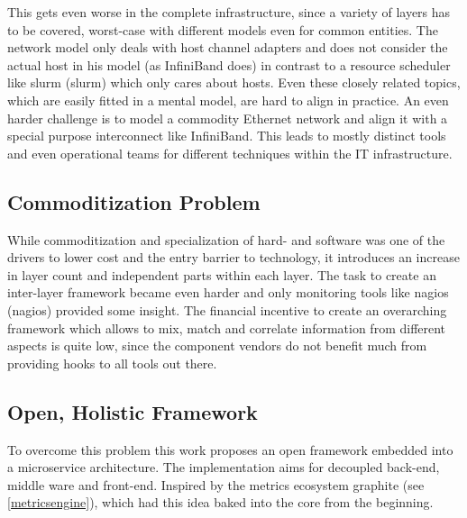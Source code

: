 This gets even worse in the complete infrastructure, since a variety of layers has to be covered, worst-case with different models even for common entities.
The network model only deals with host channel adapters and does not consider the actual host in his model (as InfiniBand does) in contrast to a resource
scheduler like \gls{slurm} (\glsdesc{slurm}) which only cares about hosts. Even these closely related topics, which are easily fitted
in a mental model, are hard to align in practice. An even harder challenge is to model a commodity Ethernet network and align it with a special purpose interconnect like InfiniBand.
This leads to mostly distinct tools and even operational teams for different techniques within the IT infrastructure.

\subsection{Commoditization Problem}
While commoditization and specialization of hard- and software was one of the drivers to lower cost and the entry barrier to technology, it
introduces an increase in layer count and
independent parts within each layer. The task to create an inter-layer framework became even harder and only monitoring tools like \gls{nagios} (\glsdesc{nagios}) provided some insight.
The financial incentive to create an overarching framework which allows to mix, match and correlate information from different aspects is quite low, since the component vendors
do not benefit much from providing hooks to all tools out there.

\subsection{Open, Holistic Framework}
To overcome this problem this work proposes an open framework embedded into a microservice architecture. The implementation aims for decoupled back-end, middle ware and front-end.
Inspired by the metrics ecosystem \gls{graphite} (see \ref{metricsengine}), which had this idea baked into the core from the beginning.
